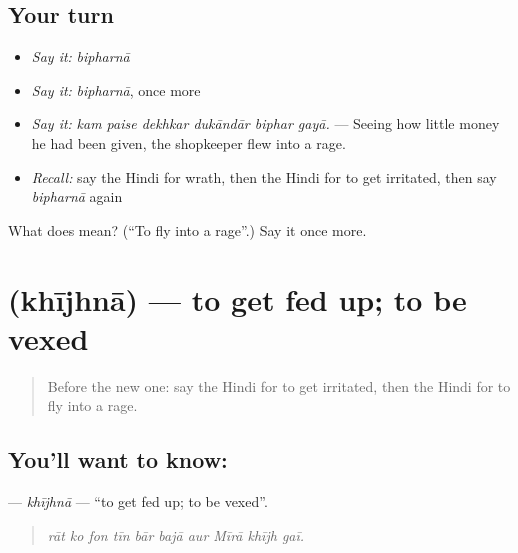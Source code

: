 \subsection*{Your turn}
\begin{itemize}
\raggedright
  \item \emph{Say it:} \emph{bipharnā}
  \item \emph{Say it:} \emph{bipharnā}, once more
  \item \emph{Say it:} \emph{kam paise dekhkar dukāndār biphar gayā.} — Seeing how little money he had been given, the shopkeeper flew into a rage.
  \item \emph{Recall:} say the Hindi for wrath, then the Hindi for to get irritated, then say \emph{bipharnā} again
\end{itemize}

\begin{tcolorbox}[breakable,colback=teal!4,colframe=teal!35!black,title={Before you move on}]
What does  mean? (\textquotedblleft{}To fly into a rage\textquotedblright{}.) Say it once more.
\end{tcolorbox}
\section[\texorpdfstring{\hi{खीझना} (khījhnā)}{खीझना (khījhnā)}]{ (khījhnā) — to get fed up; to be vexed}

\label{lesson:HI-C456-khijhna}



\begin{quote}
Before the new one: say the Hindi for to get irritated, then the Hindi for to fly into a rage.
\end{quote}

\subsection*{You'll want to know: }
\textbf{} — \emph{khījhnā} — \textquotedblleft{}to get fed up; to be vexed\textquotedblright{}.

\begin{quote}
         
\end{quote}

\begin{quote}
\emph{rāt ko fon tīn bār bajā aur Mīrā khījh gaī.}
\end{quote}

